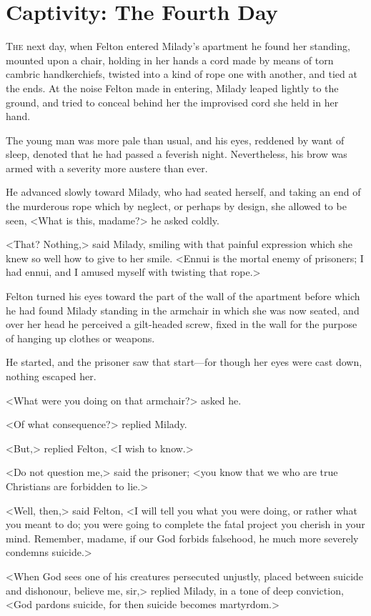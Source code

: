 
\chapter{Captivity: The Fourth Day}

\lettrine{T}{he} next day, when Felton entered Milady's apartment he found her standing, mounted upon a chair, holding in her hands a cord made by means of torn cambric handkerchiefs, twisted into a kind of rope one with another, and tied at the ends. At the noise Felton made in entering, Milady leaped lightly to the ground, and tried to conceal behind her the improvised cord she held in her hand. 

The young man was more pale than usual, and his eyes, reddened by want of sleep, denoted that he had passed a feverish night. Nevertheless, his brow was armed with a severity more austere than ever. 

He advanced slowly toward Milady, who had seated herself, and taking an end of the murderous rope which by neglect, or perhaps by design, she allowed to be seen, <What is this, madame?> he asked coldly. 

<That? Nothing,> said Milady, smiling with that painful expression which she knew so well how to give to her smile. <Ennui is the mortal enemy of prisoners; I had ennui, and I amused myself with twisting that rope.> 

Felton turned his eyes toward the part of the wall of the apartment before which he had found Milady standing in the armchair in which she was now seated, and over her head he perceived a gilt-headed screw, fixed in the wall for the purpose of hanging up clothes or weapons. 

He started, and the prisoner saw that start—for though her eyes were cast down, nothing escaped her. 

<What were you doing on that armchair?> asked he. 

<Of what consequence?> replied Milady. 

<But,> replied Felton, <I wish to know.> 

<Do not question me,> said the prisoner; <you know that we who are true Christians are forbidden to lie.> 

<Well, then,> said Felton, <I will tell you what you were doing, or rather what you meant to do; you were going to complete the fatal project you cherish in your mind. Remember, madame, if our God forbids falsehood, he much more severely condemns suicide.> 

<When God sees one of his creatures persecuted unjustly, placed between suicide and dishonour, believe me, sir,> replied Milady, in a tone of deep conviction, <God pardons suicide, for then suicide becomes martyrdom.> 

